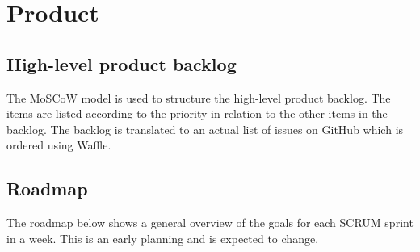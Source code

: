 \chapter{Product}

\section{High-level product backlog}
The MoSCoW model is used to structure the high-level product backlog.
The items are listed according to the priority in relation to the other items in the backlog.
The backlog is translated to an actual list of issues on GitHub which is ordered using Waffle\cite{waffle}.


\section{Roadmap}
The roadmap below shows a general overview of the goals for each SCRUM sprint in a week.
This is an early planning and is expected to change.


